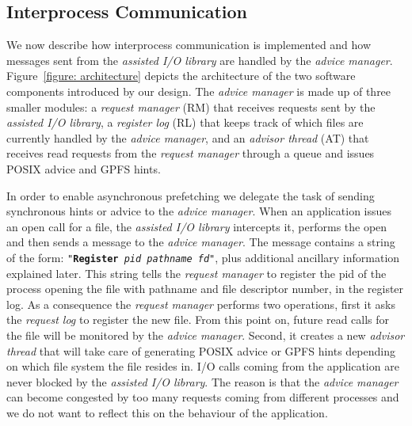 \subsection{Interprocess Communication}
We now describe how interprocess communication is implemented and how messages sent from the \textit{assisted I/O library} are handled by the \textit{advice manager}. Figure~\ref{figure: architecture} depicts the architecture of the two software 
components introduced by our design. The \textit{advice manager} is made up of three smaller modules: a \textit{request manager} (RM) that receives requests sent by the \textit{assisted I/O library}, a \textit{register log} (RL) that keeps track 
of which files are currently handled by the \textit{advice manager}, and an \textit{advisor thread} (AT) that receives read requests from the \textit{request manager} through a queue and issues POSIX advice and GPFS hints.

In order to enable asynchronous prefetching we delegate the task of sending synchronous hints or advice to the \textit{advice manager}. When an application issues an open call for a file, the \textit{assisted I/O library} intercepts it, performs 
the open and then sends a message to the \textit{advice manager}. The message contains a string of the form: \texttt{"\textbf{Register} \textit{pid} \textit{pathname} \textit{fd}"}, plus additional ancillary information explained later. This string 
tells the \textit{request manager} to register the pid of the process opening the file with pathname and file descriptor number, in the register log. As a consequence the \textit{request manager} performs two operations, first it asks the 
\textit{request log} to register the new file. From this point on, future read calls for the file will be monitored by the \textit{advice manager}. Second, it creates a new \textit{advisor thread} that will take care of generating POSIX advice or 
GPFS hints depending on which file system the file resides in. I/O calls coming from the application are never blocked by the \textit{assisted I/O library}. The reason is that the \textit{advice manager} can become congested by too many requests 
coming from different processes and we do not want to reflect this on the behaviour of the application.  %

